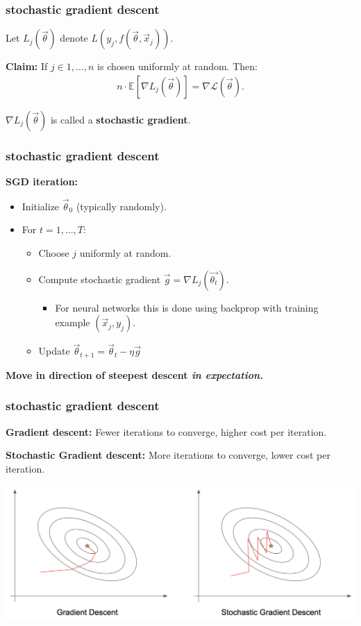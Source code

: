 \documentclass[handout,compress]{beamer}
\newcommand{\E}{\mathbb{E}}
\begin{document}
	\begin{frame}
		\frametitle{stochastic gradient descent}
		Let $L_j(\vec{\theta})$ denote $L\left(y_j,f(\vec{\theta},\vec{x}_j)\right)$.
		
		\textbf{Claim:} If $j \in 1, \ldots, n$ is chosen uniformly at random. Then:
		\begin{align*}
		n\cdot\E\left[\nabla L_j(\vec{\theta}) \right] = \nabla \mathcal{L}(\vec{\theta}).
		\end{align*}
		\vspace{5em}
		
		$\nabla L_j(\vec{\theta})$ is called a \textbf{\alert{stochastic gradient}}.
	\end{frame}
	
	\begin{frame}
		\frametitle{stochastic gradient descent}
		\textbf{SGD iteration:}
		\begin{itemize}
			\item Initialize $\vec{\theta}_0$ (typically randomly).
			\item For $t = 1, \ldots, T$:
			\begin{itemize}
				\item Choose $j$ uniformly at random.
				\item Compute stochastic gradient $\vec{g} = \nabla L_j(\vec{\theta_t})$.
				\begin{itemize}
					\item For neural networks this is done using backprop with training example $(\vec{x}_j, y_j)$. 
				\end{itemize}
				\item Update $\vec{\theta}_{t+1} = \vec{\theta}_{t} - \eta \vec{g}$
			\end{itemize}
		\end{itemize}
		\begin{center}
			\textbf{\alert{Move in direction of steepest descent \emph{in expectation.}}}
		\end{center}
	\end{frame}
	
	\begin{frame}
		\frametitle{stochastic gradient descent}
		\textbf{Gradient descent:} Fewer iterations to converge, higher cost per iteration.
		
		\textbf{Stochastic Gradient descent:} More iterations to converge, lower cost per iteration.
		
		\begin{center}
			\includegraphics[width=\textwidth]{sgd_path_tame.png}
		\end{center}
	\end{frame}
	
\end{document}
